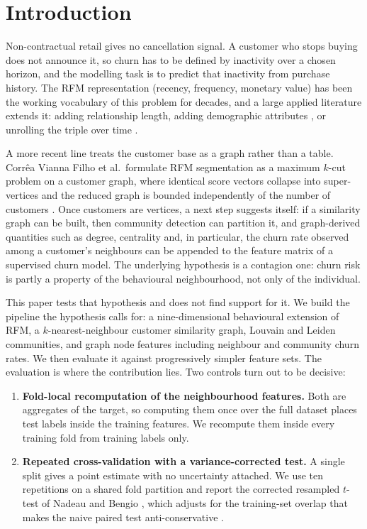 \documentclass[runningheads]{llncs}
\begin{document}
\section{Introduction}

Non-contractual retail gives no cancellation signal. A customer who stops buying
does not announce it, so churn has to be defined by inactivity over a chosen
horizon, and the modelling task is to predict that inactivity from purchase
history. The RFM representation (recency, frequency, monetary value) has been
the working vocabulary of this problem for decades, and a large applied
literature extends it: adding relationship length, adding demographic attributes
\cite{ho2023extended}, or unrolling the triple over time
\cite{mena2023timevarying}.

A more recent line treats the customer base as a graph rather than a table.
Corr\^{e}a Vianna Filho et al.\ formulate RFM segmentation as a maximum $k$-cut
problem on a customer graph, where identical score vectors collapse into
super-vertices and the reduced graph is bounded independently of the number of
customers \cite{viannafilho2026rfm}. Once customers are vertices, a next step
suggests itself: if a similarity graph can be built, then community detection
\cite{blondel2008louvain,traag2019leiden} can partition it, and graph-derived
quantities such as degree, centrality and, in particular, the churn rate observed
among a customer's neighbours can be appended to the feature matrix of a supervised
churn model. The underlying hypothesis is a contagion one: churn risk is partly a
property of the behavioural neighbourhood, not only of the individual.

This paper tests that hypothesis and does not find support for it. We build the
pipeline the hypothesis calls for: a nine-dimensional behavioural extension of
RFM, a $k$-nearest-neighbour customer similarity graph, Louvain and Leiden
communities, and graph node features including neighbour and community churn
rates. We then evaluate it against progressively simpler feature sets. The
evaluation is where the contribution lies. Two controls turn out to be decisive:

\begin{enumerate}
\item \textbf{Fold-local recomputation of the neighbourhood features.} Both are
aggregates of the target, so computing them once over the full dataset places
test labels inside the training features. We recompute them inside every training
fold from training labels only.
\item \textbf{Repeated cross-validation with a variance-corrected test.} A single
split gives a point estimate with no uncertainty attached. We use ten repetitions
on a shared fold partition and report the corrected resampled $t$-test of Nadeau
and Bengio \cite{nadeau2003inference}, which adjusts for the training-set overlap
that makes the naive paired test anti-conservative
\cite{dietterich1998approximate,bouckaert2004replicability}.
\end{enumerate}
\end{document}
